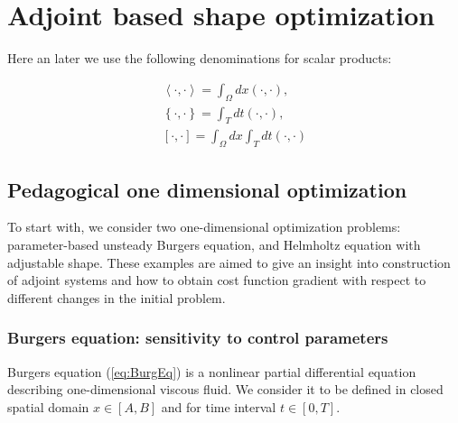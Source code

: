 
\chapter{Adjoint based shape optimization}

\ifpdf
    \graphicspath{{Chapter2/Figs/Raster/}{Chapter2/Figs/PDF/}{Chapter2/Figs/}}
\else
    \graphicspath{{Chapter2/Figs/Vector/}{Chapter2/Figs/}}
\fi

Here an later we use the following denominations for scalar products:

\begin{subequations}
\begin{align}
          \left< \cdot, \cdot \right> = \int_{\Omega} dx (\cdot, \cdot ), \\
          \left\{ \cdot, \cdot \right\} = \int_{T} dt (\cdot, \cdot ), \\
          \left[ \cdot, \cdot  \right] = \int_{\Omega} dx\int_{T} dt (\cdot, \cdot )
\end{align}
\end{subequations}


\section{Pedagogical one dimensional optimization}

To start with, we consider two one-dimensional optimization problems: parameter-based unsteady Burgers equation, and Helmholtz equation with adjustable shape. These examples are aimed to give an insight into construction of adjoint systems and how to obtain cost function gradient with respect to different changes in the initial problem.

\subsection{Burgers equation: sensitivity to control parameters}

Burgers equation (\ref{eq:BurgEq}) is a nonlinear partial differential equation describing one-dimensional viscous fluid. We consider it to be defined in closed spatial domain $x \in [A,B]$ and for time interval $t \in [0, T]$.

